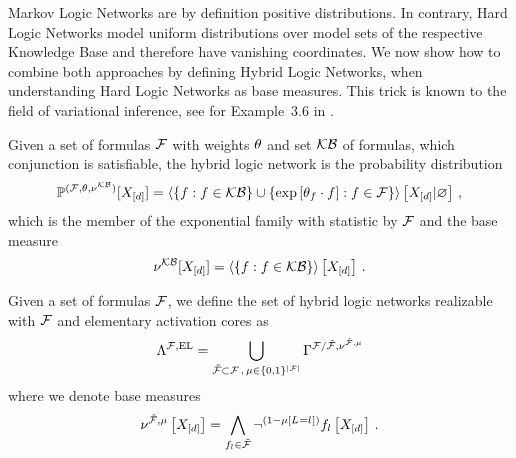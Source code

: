 








Markov Logic Networks are by definition positive distributions.
In contrary, Hard Logic Networks model uniform distributions over model sets of the respective Knowledge Base and therefore have vanishing coordinates.
We now show how to combine both approaches by defining Hybrid Logic Networks, when understanding Hard Logic Networks as base measures.
This trick is known to the field of variational inference, see for Example~3.6 in \cite{wainwright_graphical_2008}. 

\begin{definition}\label{def:hln}
	Given a set of formulas $\mathcal{F}$ with weights $\theta$ and set $\mathcal{KB}$ of formulas, which conjunction is satisfiable, the hybrid logic network is the probability distribution
	\begin{align*}
		\mathbb{P}^{(\mathcal{F},\theta,\nu^{\mathcal{KB}})}[X_{[d]}] 
		= \left\langle 
		\{f : f\in\mathcal{KB}\} \cup \{\mathrm{exp}\left[\theta_{f}\cdot f\right] : f\in\mathcal{F}\}
		\right\rangle \left[ X_{[d]} | \varnothing \right] \, ,
	\end{align*}
	which is the member of the exponential family with statistic by $\mathcal{F}$ and the base measure
		\[ \nu^{\mathcal{KB}}[X_{[d]}] = \left\langle \{f : f \in \mathcal{KB}\}\right\rangle \left[ X_{[d]} \right] \, .\]
		
	Given a set of formulas $\mathcal{F}$, we define the set of hybrid logic networks realizable with $\mathcal{F}$ and elementary activation cores as
	\begin{align*}
		\Lambda^{\mathcal{F},\mathrm{EL}} 
		= \bigcup_{\tilde{\mathcal{F}}\subset\mathcal{F} \, , \, \mu\in\{0,1\}^{\left|\mathcal{F}\right|}}
		\Gamma^{\mathcal{F}/\tilde{\mathcal{F}},\nu^{\tilde{\mathcal{F}},\mu}}
	\end{align*}
	where we denote base measures
	\begin{align*}
		\nu^{\tilde{\mathcal{F}},\mu}\left[X_{[d]}\right]
		= \bigwedge_{f_{l}\in\tilde{\mathcal{F}}} \lnot^{(1-\mu\left[L_{}=l_{}\right])} f_{l}\left[X_{[d]}\right] \, . 
	\end{align*}
\end{definition}

